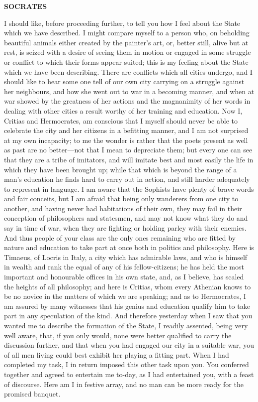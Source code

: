 \documentclass[11pt,letter]{article}
\begin{document}
\par \textbf{SOCRATES}
\par   I should like, before proceeding further, to tell you how I feel about the State which we have described. I might compare myself to a person who, on beholding beautiful animals either created by the painter’s art, or, better still, alive but at rest, is seized with a desire of seeing them in motion or engaged in some struggle or conflict to which their forms appear suited; this is my feeling about the State which we have been describing. There are conflicts which all cities undergo, and I should like to hear some one tell of our own city carrying on a struggle against her neighbours, and how she went out to war in a becoming manner, and when at war showed by the greatness of her actions and the magnanimity of her words in dealing with other cities a result worthy of her training and education. Now I, Critias and Hermocrates, am conscious that I myself should never be able to celebrate the city and her citizens in a befitting manner, and I am not surprised at my own incapacity; to me the wonder is rather that the poets present as well as past are no better—not that I mean to depreciate them; but every one can see that they are a tribe of imitators, and will imitate best and most easily the life in which they have been brought up; while that which is beyond the range of a man’s education he finds hard to carry out in action, and still harder adequately to represent in language. I am aware that the Sophists have plenty of brave words and fair conceits, but I am afraid that being only wanderers from one city to another, and having never had habitations of their own, they may fail in their conception of philosophers and statesmen, and may not know what they do and say in time of war, when they are fighting or holding parley with their enemies. And thus people of your class are the only ones remaining who are fitted by nature and education to take part at once both in politics and philosophy. Here is Timaeus, of Locris in Italy, a city which has admirable laws, and who is himself in wealth and rank the equal of any of his fellow-citizens; he has held the most important and honourable offices in his own state, and, as I believe, has scaled the heights of all philosophy; and here is Critias, whom every Athenian knows to be no novice in the matters of which we are speaking; and as to Hermocrates, I am assured by many witnesses that his genius and education qualify him to take part in any speculation of the kind. And therefore yesterday when I saw that you wanted me to describe the formation of the State, I readily assented, being very well aware, that, if you only would, none were better qualified to carry the discussion further, and that when you had engaged our city in a suitable war, you of all men living could best exhibit her playing a fitting part. When I had completed my task, I in return imposed this other task upon you. You conferred together and agreed to entertain me to-day, as I had entertained you, with a feast of discourse. Here am I in festive array, and no man can be more ready for the promised banquet.
\end{document}
